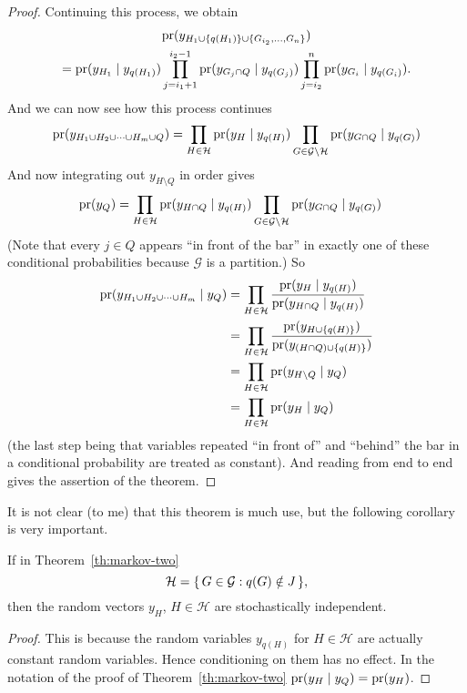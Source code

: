 \begin{proof}
Continuing this process, we obtain
\begin{multline*}
   \operatorname{pr}(y_{H_1 \cup \{q(H_1)\} \cup \{ G_{i_2}, \ldots, G_n \}})
   \\
   =
   \operatorname{pr}(y_{H_1} \mid y_{q(H_1)})
   \prod_{j = i_1 + 1}^{i_2 - 1}
   \operatorname{pr}(y_{G_j \cap Q} \mid y_{q(G_j)})
   \prod_{j = i_2}^n
   \operatorname{pr}(y_{G_i} \mid y_{q(G_i)}).
\end{multline*}
And we can now see how this process continues
$$
   \operatorname{pr}(y_{H_1 \cup H_2 \cup \cdots \cup H_m \cup Q})
   =
   \prod_{H \in \mathcal{H}}
   \operatorname{pr}(y_H \mid y_{q(H)})
   \prod_{G \in \mathcal{G} \setminus \mathcal{H}}
   \operatorname{pr}(y_{G \cap Q} \mid y_{q(G)})
$$
And now integrating out $y_{H \setminus Q}$ in order gives
\begin{align*}
   \operatorname{pr}(y_Q)
   & =
   \prod_{H \in \mathcal{H}}
   \operatorname{pr}(y_{H \cap Q} \mid y_{q(H)})
   \prod_{G \in \mathcal{G} \setminus \mathcal{H}}
   \operatorname{pr}(y_{G \cap Q} \mid y_{q(G)})
\end{align*}
(Note that every $j \in Q$ appears ``in front of the bar'' in
exactly one of these conditional probabilities because $\mathcal{G}$
is a partition.)
So
\begin{align*}
   \operatorname{pr}(y_{H_1 \cup H_2 \cup \cdots \cup H_m} \mid y_Q)
   & =
   \prod_{H \in \mathcal{H}}
   \frac{ \operatorname{pr}(y_H \mid y_{q(H)}) }{ \operatorname{pr}(y_{H \cap Q} \mid y_{q(H)}) }
   \\
   & =
   \prod_{H \in \mathcal{H}}
   \frac{ \operatorname{pr}(y_{H \cup \{q(H)\}}) }{ \operatorname{pr}(y_{(H \cap Q) \cup \{q(H)\}}) }
   \\
   & =
   \prod_{H \in \mathcal{H}}
   \operatorname{pr}( y_{H \setminus Q} \mid y_{Q} )
   \\
   & =
   \prod_{H \in \mathcal{H}}
   \operatorname{pr}( y_H \mid y_{Q} )
\end{align*}
(the last step being that variables repeated ``in front of'' and ``behind''
the bar in a conditional probability are treated as constant).
And reading from end to end gives the assertion of the theorem.
\end{proof}

It is not clear (to me) that this theorem is much use,
but the following corollary is very important.
\begin{corollary} \label{cor:independent}
If in Theorem~\ref{th:markov-two}
$$
   \mathcal{H} = \{\,  G \in \mathcal{G} : q(G) \notin J  \,\},
$$
then the random vectors
$y_H$, $H \in \mathcal{H}$ are stochastically independent.
\end{corollary}
\begin{proof}
This is because the random variables $y_{q(H)}$ for $H \in \mathcal{H}$
are actually constant random variables.  Hence conditioning on them
has no effect.  In the notation of the proof of Theorem~\ref{th:markov-two}
$\operatorname{pr}( y_H \mid y_{Q} ) = \operatorname{pr}( y_H )$.
\end{proof}

